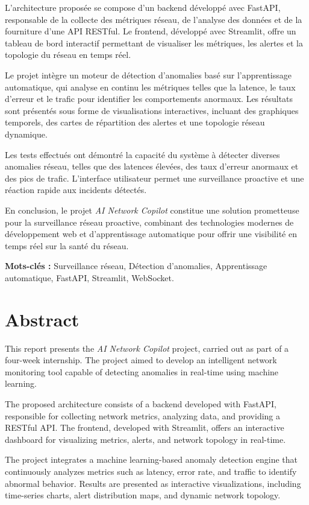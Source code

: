 \documentclass[12pt,a4paper]{report}
\begin{document}
L'architecture proposée se compose d'un backend développé avec FastAPI, responsable de la collecte des métriques réseau, de l'analyse des données et de la fourniture d'une API RESTful. Le frontend, développé avec Streamlit, offre un tableau de bord interactif permettant de visualiser les métriques, les alertes et la topologie du réseau en temps réel.

Le projet intègre un moteur de détection d'anomalies basé sur l'apprentissage automatique, qui analyse en continu les métriques telles que la latence, le taux d'erreur et le trafic pour identifier les comportements anormaux. Les résultats sont présentés sous forme de visualisations interactives, incluant des graphiques temporels, des cartes de répartition des alertes et une topologie réseau dynamique.

Les tests effectués ont démontré la capacité du système à détecter diverses anomalies réseau, telles que des latences élevées, des taux d'erreur anormaux et des pics de trafic. L'interface utilisateur permet une surveillance proactive et une réaction rapide aux incidents détectés.

En conclusion, le projet \textit{AI Network Copilot} constitue une solution prometteuse pour la surveillance réseau proactive, combinant des technologies modernes de développement web et d'apprentissage automatique pour offrir une visibilité en temps réel sur la santé du réseau.

\textbf{Mots-clés :} Surveillance réseau, Détection d'anomalies, Apprentissage automatique, FastAPI, Streamlit, WebSocket.

\chapter*{Abstract}
\thispagestyle{empty}

This report presents the \textit{AI Network Copilot} project, carried out as part of a four-week internship. The project aimed to develop an intelligent network monitoring tool capable of detecting anomalies in real-time using machine learning.

The proposed architecture consists of a backend developed with FastAPI, responsible for collecting network metrics, analyzing data, and providing a RESTful API. The frontend, developed with Streamlit, offers an interactive dashboard for visualizing metrics, alerts, and network topology in real-time.

The project integrates a machine learning-based anomaly detection engine that continuously analyzes metrics such as latency, error rate, and traffic to identify abnormal behavior. Results are presented as interactive visualizations, including time-series charts, alert distribution maps, and dynamic network topology.
\end{document}
